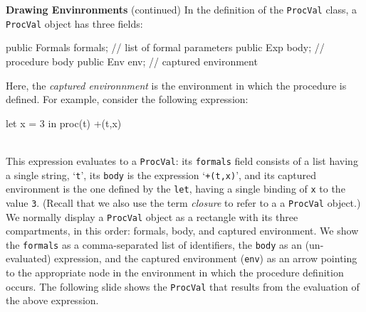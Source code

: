 \begin{minipage}[t]{\sw}
\slidenumber
\LARGE
{\bf Drawing Envinronments} (continued)\exx
In the definition of the \verb'ProcVal' class,
a \verb'ProcVal' object has three fields:
\Large
\begin{qv}
public Formals formals; // list of formal parameters
public Exp body;        // procedure body
public Env env;         // captured environment
\end{qv}
\LARGE
Here, the {\em captured environnment} is the environment
in which the procedure is defined.
For example, consider the following expression:\\[1.5ex]
\Large
\begin{verbbox}
let
  x = 3
in
  proc(t) +(t,x)
\end{verbbox}
\emm\theverbbox\\[1.5ex]
\LARGE
This expression evaluates to a \verb'ProcVal':
its \verb'formals' field consists of a list having a single string, `\verb't'',
its \verb'body' is the expression `\verb'+(t,x)'',
and its captured environment is the one defined by the \verb'let',
having a single binding of \verb'x' to the value \verb'3'.
(Recall that we also use the term {\em closure}
to refer to a a \verb'ProcVal' object.)
We normally display a \verb'ProcVal' object as a rectangle
with its three compartments, in this order:
formals, body, and captured environment.
We show the \verb'formals' as a comma-separated list of identifiers,
the \verb'body' as an (un-evaluated) expression,
and the captured environment (\verb'env') as an arrow
pointing to the appropriate node in the environment
in which the procedure definition occurs.
The following slide shows the \verb'ProcVal' that results
from the evaluation of the above expression.
\end{minipage}
\clearpage
